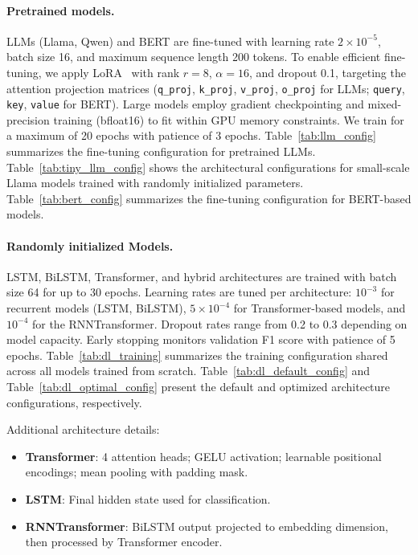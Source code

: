 \documentclass{article}
\theoremstyle{plain}
\theoremstyle{definition}
\theoremstyle{remark}
\begin{document}
\paragraph{Pretrained models.}
LLMs (Llama, Qwen) and BERT are fine-tuned with learning rate $2 \times 10^{-5}$, batch size 16, and maximum sequence length 200 tokens. To enable efficient fine-tuning, we apply LoRA~\citep{LoRA} with rank $r=8$, $\alpha=16$, and dropout 0.1, targeting the attention projection matrices (\texttt{q\_proj}, \texttt{k\_proj}, \texttt{v\_proj}, \texttt{o\_proj} for LLMs; \texttt{query}, \texttt{key}, \texttt{value} for BERT). Large models employ gradient checkpointing and mixed-precision training (bfloat16) to fit within GPU memory constraints. We train for a maximum of 20 epochs with patience of 3 epochs. Table~\ref{tab:llm_config} summarizes the fine-tuning configuration for pretrained LLMs. Table~\ref{tab:tiny_llm_config} shows the architectural configurations for small-scale Llama models trained with randomly initialized parameters. Table~\ref{tab:bert_config} summarizes the fine-tuning configuration for BERT-based models.

\paragraph{Randomly initialized Models.}
LSTM, BiLSTM, Transformer, and hybrid architectures are trained with batch size 64 for up to 30 epochs. Learning rates are tuned per architecture: $10^{-3}$ for recurrent models (LSTM, BiLSTM), $5 \times 10^{-4}$ for Transformer-based models, and $10^{-4}$ for the RNNTransformer. Dropout rates range from 0.2 to 0.3 depending on model capacity. Early stopping monitors validation F1 score with patience of 5 epochs. Table~\ref{tab:dl_training} summarizes the training configuration shared across all models trained from scratch. Table~\ref{tab:dl_default_config} and Table~\ref{tab:dl_optimal_config} present the default and optimized architecture configurations, respectively.

Additional architecture details:
\begin{itemize}
    \item \textbf{Transformer}: 4 attention heads; GELU activation; learnable positional encodings; mean pooling with padding mask.
    \item \textbf{LSTM}: Final hidden state used for classification.
    \item \textbf{RNNTransformer}: BiLSTM output projected to embedding dimension, then processed by Transformer encoder.
\end{itemize}
\end{document}

